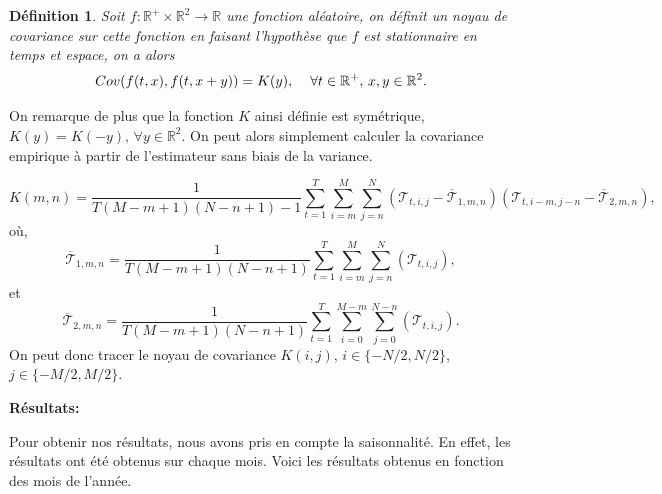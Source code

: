 \documentclass[a4paper,11pt]{article}
\newtheorem{definition}{Définition}
\begin{document}
\begin{definition}
	Soit $f:\mathbb{R}^{+}\times\mathbb{R}^2\to \mathbb{R}$ une fonction aléatoire, on définit un noyau de covariance sur cette fonction en faisant l'hypothèse que $f$ est stationnaire en temps et espace, on a alors
	\[Cov(f(t,x),f(t,x+y))=K(y), \hspace{4mm} \forall t \in \mathbb{R}^{+},\,x,y \in \mathbb{R}^2. \] 
\end{definition}
On remarque de plus que la fonction $K$ ainsi définie est symétrique, $K(y)=K(-y),\, \forall y \in \mathbb{R}^2$. On peut alors simplement calculer la covariance empirique à partir de l'estimateur sans biais de la variance.

\[K(m,n)=\frac{1}{T(M-m+1)(N-n+1)-1}\sum_{t=1}^{T}\sum_{i=m}^{M}\sum_{j=n}^{N}(\mathcal{T}_{t,i,j}-\overline{\mathcal{T}}_{1,m,n})(\mathcal{T}_{t,i-m,j-n}-\overline{\mathcal{T}}_{2,m,n}),\]
où,
\[\overline{\mathcal{T}}_{1,m,n}=\frac{1}{T(M-m+1)(N-n+1)}\sum_{t=1}^{T}\sum_{i=m}^{M}\sum_{j=n}^{N}(\mathcal{T}_{t,i,j}),\]
et 
\[\overline{\mathcal{T}}_{2,m,n}=\frac{1}{T(M-m+1)(N-n+1)}\sum_{t=1}^{T}\sum_{i=0}^{M-m}\sum_{j=0}^{N-n}(\mathcal{T}_{t,i,j}).\]
On peut donc tracer le noyau de covariance $K(i,j)$, $i \in\{-N/2,N/2\}$, $j \in \{-M/2,M/2\}$. 

\noindent \textbf{Résultats:}

Pour obtenir nos résultats, nous avons pris en compte la saisonnalité. En effet, les résultats ont été obtenus sur chaque mois. Voici les résultats obtenus en fonction des mois de l'année.
\end{document}
